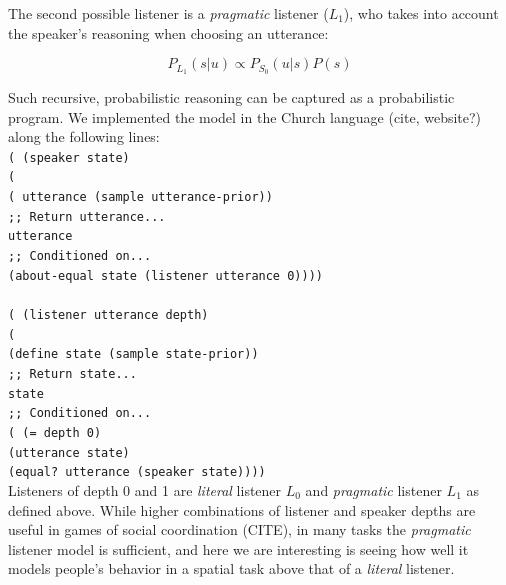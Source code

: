 \documentclass[10pt,letterpaper]{article}
\newcommand\tab[1][0.5cm]{\hspace*{#1}}
\begin{document}
The second possible listener is a \textit{pragmatic} listener ($L_1$), who takes into account the speaker's reasoning when choosing an utterance:

\begin{equation}
P_{L_1}(s|u)\propto P_{S_0}(u|s)P(s)
\end{equation}

Such recursive, probabilistic reasoning can be captured as a probabilistic program. We implemented the model in the Church language (cite, website?) along the following lines: \\

\texttt{({\color{blue}{define}} (speaker state)}\\
\texttt{\tab ({\color{blue}{rejection-query}}}\\
\texttt{\tab  ({\color{blue}{define}} utterance (sample utterance-prior))}\\
\texttt{\tab   \color{BurntOrange};; Return utterance...}\\
\texttt{\tab   utterance}\\
\texttt{\tab   \color{BurntOrange};; Conditioned on...}\\
\texttt{\tab  (about-equal state (listener utterance 0))))}\\
\texttt{}\\
\texttt{({\color{blue}{define}} (listener utterance depth)}\\
\texttt{\tab ({\color{blue}{rejection-query}}}\\
\texttt{\tab  (define state (sample state-prior))}\\
\texttt{\tab   \color{BurntOrange};; Return state...}\\
\texttt{\tab  state}\\
\texttt{\tab   \color{BurntOrange};; Conditioned on...}\\
\texttt{\tab  ({\color{blue}{if}} (= depth 0)}\\
\texttt{\tab \tab \tab  (utterance state)}\\
\texttt{\tab \tab \tab  (equal? utterance (speaker state))))}\\

Listeners of depth 0 and 1 are \textit{literal} listener $L_0$ and \textit{pragmatic} listener $L_1$ as defined above. While higher combinations of listener and speaker depths are useful in games of social coordination (CITE), in many tasks the \textit{pragmatic} listener model is sufficient, and here we are interesting is seeing how well it models people's behavior in a spatial task above that of a \textit{literal} listener. 
\end{document}
